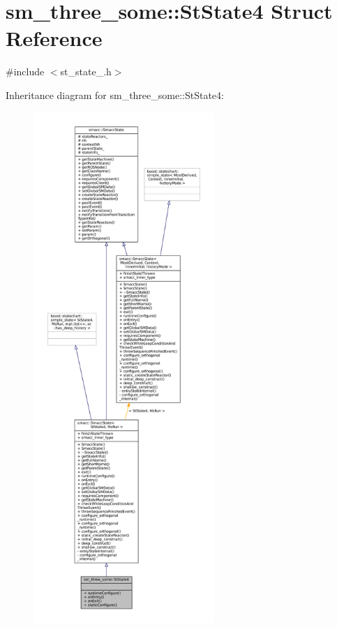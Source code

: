 \hypertarget{structsm__three__some_1_1StState4}{}\section{sm\+\_\+three\+\_\+some\+:\+:St\+State4 Struct Reference}
\label{structsm__three__some_1_1StState4}


{\ttfamily \#include $<$st\+\_\+state\+\_.\+h$>$}



Inheritance diagram for sm\+\_\+three\+\_\+some\+:\+:St\+State4\+:
\nopagebreak
\begin{figure}[H]
\begin{center}
\leavevmode
\includegraphics[height=550pt]{structsm__three__some_1_1StState4__inherit__graph}
\end{center}
\end{figure}


